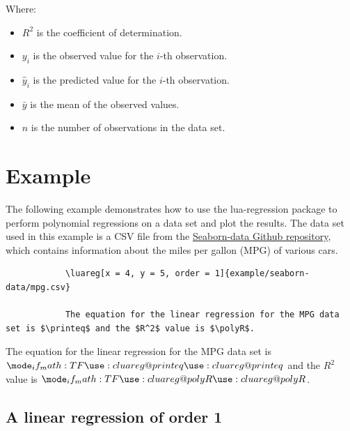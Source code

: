 \documentclass[11pt]{article}
\begin{document}
    
    Where:
    \begin{itemize}
        \item $R^2$ is the coefficient of determination.
        \item $y_i$ is the observed value for the $i$-th observation.
        \item $\hat{y}_i$ is the predicted value for the $i$-th observation.
        \item $\bar{y}$ is the mean of the observed values.
        \item $n$ is the number of observations in the data set.
    \end{itemize}

    \pagebreak

    \section{Example}

    The following example demonstrates how to use the {\ttfamily lua-regression} package to perform polynomial regressions on a data set and plot the results.
    The data set used in this example is a CSV file from the \href{https://github.com/mwaskom/seaborn-data}{Seaborn-data Github repository}, which contains information about the miles per gallon (MPG) of various cars.

    
   

	\begin{codebox2}
	    \begin{verbatim}
	        \luareg[x = 4, y = 5, order = 1]{example/seaborn-data/mpg.csv}
	
	        The equation for the linear regression for the MPG data set is $\printeq$ and the $R^2$ value is $\polyR$.
	    \end{verbatim}

	\tcblower
	

    
    The equation for the linear regression for the MPG data set is $\printeq$ and the $R^2$ value is $\polyR$.
     \end{codebox2}

    \pagebreak

    \subsection{A linear regression of order 1}
\end{document}

